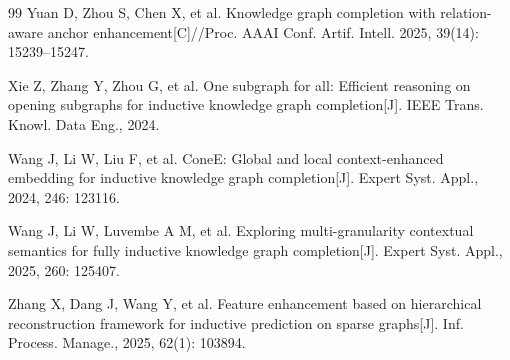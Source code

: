 \documentclass[preprint,12pt]{elsarticle}
\begin{document}
\begin{thebibliography}{99}
Yuan D, Zhou S, Chen X, et al.
Knowledge graph completion with relation-aware anchor enhancement[C]//Proc. AAAI Conf. Artif. Intell.
2025, 39(14): 15239--15247.

Xie Z, Zhang Y, Zhou G, et al.
One subgraph for all: Efficient reasoning on opening subgraphs for inductive knowledge graph completion[J]. IEEE Trans. Knowl. Data Eng., 2024.

Wang J, Li W, Liu F, et al.
ConeE: Global and local context-enhanced embedding for inductive knowledge graph completion[J]. Expert Syst. Appl., 2024, 246: 123116.

Wang J, Li W, Luvembe A M, et al.
Exploring multi-granularity contextual semantics for fully inductive knowledge graph completion[J]. Expert Syst. Appl., 2025, 260: 125407.

Zhang X, Dang J, Wang Y, et al.
Feature enhancement based on hierarchical reconstruction framework for inductive prediction on sparse graphs[J]. Inf. Process. Manage., 2025, 62(1): 103894.


\end{thebibliography}
\end{document}
